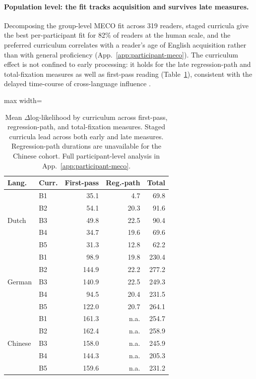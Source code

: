 \paragraph{Population level: the fit tracks acquisition and survives late measures.} Decomposing the group-level MECO fit across 319 readers, staged curricula give the best per-participant fit for 82\% of readers at the human scale, and the preferred curriculum correlates with a reader's age of English acquisition rather than with general proficiency (App.~\ref{app:participant-meco}). The curriculum effect is not confined to early processing: it holds for the late regression-path and total-fixation measures as well as first-pass reading (Table~\ref{tab:beetle-earlylate}), consistent with the delayed time-course of cross-language influence \citep{hoversten2016time}.

\begin{table}[t]
\centering
\small
\setlength{\tabcolsep}{4pt}
\begin{adjustbox}{max width=\columnwidth}
\begin{tabular}{llrrr}
\toprule
Lang. & Curr. & First-pass & Reg.-path & Total \\
\midrule
\multirow{5}{*}{Dutch}
 & B1 & 35.1 & 4.7  & 69.8 \\
 & B2 & 54.1 & 20.3 & 91.6 \\
 & B3 & 49.8 & 22.5 & 90.4 \\
 & B4 & 34.7 & 19.6 & 69.6 \\
 & B5 & 31.3 & 12.8 & 62.2 \\
\midrule
\multirow{5}{*}{German}
 & B1 & 98.9  & 19.8 & 230.4 \\
 & B2 & 144.9 & 22.2 & 277.2 \\
 & B3 & 140.9 & 22.5 & 249.3 \\
 & B4 & 94.5  & 20.4 & 231.5 \\
 & B5 & 122.0 & 20.7 & 264.1 \\
\midrule
\multirow{5}{*}{Chinese}
 & B1 & 161.3 & n.a. & 254.7 \\
 & B2 & 162.4 & n.a. & 258.9 \\
 & B3 & 158.0 & n.a. & 245.9 \\
 & B4 & 144.3 & n.a. & 205.3 \\
 & B5 & 159.6 & n.a. & 231.2 \\
\bottomrule
\end{tabular}
\end{adjustbox}
\caption{Mean $\Delta$log-likelihood by curriculum across first-pass, regression-path, and total-fixation measures. Staged curricula lead across both early and late measures. Regression-path durations are unavailable for the Chinese cohort. Full participant-level analysis in App.~\ref{app:participant-meco}.}
\label{tab:beetle-earlylate}
\end{table}

